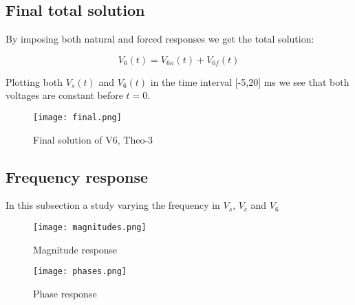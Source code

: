 \subsection{Final total solution} 
By imposing both natural and forced responses we get the total solution: 

\begin{equation}
  V_6(t)= V_{6n}(t) + V_{6f}(t)
  \label{}
\end{equation}    

Plotting both $V_s(t)$ and $V_6(t)$ in the time interval [-5,20] ms we see that both voltages are constant before $t=0$.

\FloatBarrier
\begin{figure}
  \texttt{[image: final.png]}
  \caption{Final solution of V6, Theo-3}
  \label{fig:final}
\end{figure}
\FloatBarrier 

\subsection {Frequency response} 

In this subsection a study varying the frequency in $V_s$, $V_c$ and $V_6$
\FloatBarrier
\begin{figure}
  \texttt{[image: magnitudes.png]}
  \caption{Magnitude response}
  \label{fig:magnitudes}
\end{figure}

\begin{figure}
  \texttt{[image: phases.png]}
  \caption{Phase response}
  \label{fig:phases}
\end{figure}
\FloatBarrier





%    

%   
